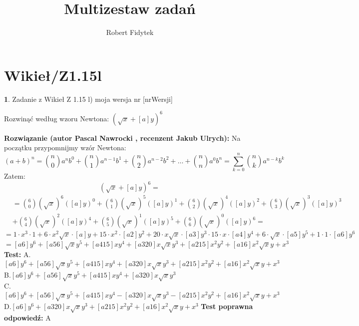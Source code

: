 \documentclass[12pt, a4paper]{article}
\title{Multizestaw zadań}
\author{Robert Fidytek}
\date{}
\theoremstyle{definition} %
\newtheorem{zad}{}
\newcommand{\kategoria}[1]{\section{#1}} %
\newcommand{\zadStart}[1]{\begin{zad}#1\newline} %
\newcommand{\zadStop}{\end{zad}}   %
\newcommand{\rozwStart}[2]{\noindent \textbf{Rozwiązanie (autor #1 , recenzent #2): }\newline} %
\newcommand{\odpStop}{\newline}                                             %
\newcommand{\testStart}{\noindent \textbf{Test:}\newline} %
\newcommand{\testStop}{\newline} %
\newcommand{\kluczStart}{\noindent \textbf{Test poprawna odpowiedź:}\newline} %
\newcommand{\kluczStop}{\newline} %
\begin{document}
\maketitle



\kategoria{Wikieł/Z1.15l}
\zadStart{Zadanie z Wikieł Z 1.15 l) moja wersja nr [nrWersji]}


Rozwinąć według wzoru Newtona: $(\sqrt{x}+[a]y)^6$
\zadStop
\rozwStart{Pascal Nawrocki}{Jakub Ulrych}
Na początku przypomnijmy wzór Newtona:$$(a+b)^n={n\choose 0}a^{n}b^{0}+{n\choose 1}a^{n-1}b^{1}+{n\choose 2}a^{n-2}b^{2}+\dots+{n\choose n}a^{0}b^{n}=\sum_{k=0}^{n} {n\choose k}a^{n-k}b^{k}$$
Zatem:
$$(\sqrt{x}+[a]y)^6=$$
\begin{equation}
\begin{split}
&={6\choose0}(\sqrt{x})^6([a]y)^0+{6\choose1}(\sqrt{x})^5([a]y)^1+{6\choose2}(\sqrt{x})^4([a]y)^2+{6\choose3}(\sqrt{x})^3([a]y)^3\\&+{6\choose4}(\sqrt{x})^2([a]y)^4+{6\choose5}(\sqrt{x})^1([a]y)^5+{6\choose6}(\sqrt{x})^0([a]y)^6=
\end{split}
\end{equation}
$$=1\cdot x^3\cdot1+6\cdot x^2\sqrt{x}\cdot[a]y+15\cdot x^2\cdot[a2]y^2+20\cdot x\sqrt{x}\cdot[a3]y^3\cdot15\cdot x\cdot[a4]y^4+6\cdot \sqrt{x}\cdot[a5]y^5+1\cdot1\cdot[a6]y^6$$
$$=[a6]y^6+[a56]\sqrt{x}y^5+[a415]xy^4+[a320]x\sqrt{x}y^3+[a215]x^2y^2+[a16]x^2\sqrt{x}y+x^3$$
\odpStop
\testStart
A.$[a6]y^6+[a56]\sqrt{x}y^5+[a415]xy^4+[a320]x\sqrt{x}y^3+[a215]x^2y^2+[a16]x^2\sqrt{x}y+x^3$
\\
B.$[a6]y^6+[a56]\sqrt{x}y^5+[a415]xy^4+[a320]x\sqrt{x}y^3$
\\
C.$[a6]y^6+[a56]\sqrt{x}y^5+[a415]xy^4-[a320]x\sqrt{x}y^3-[a215]x^2y^2+[a16]x^2\sqrt{x}y+x^3$
\\
D.$[a6]y^6+[a320]x\sqrt{x}y^3+[a215]x^2y^2+[a16]x^2\sqrt{x}y+x^3$
\testStop
\kluczStart
A
\kluczStop
\end{document}
